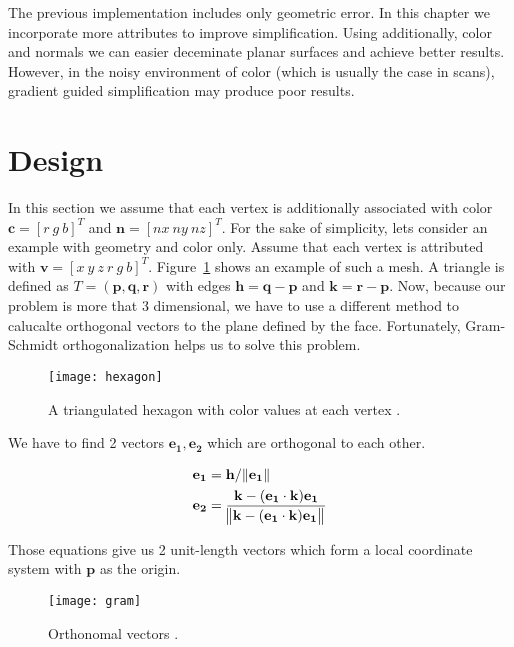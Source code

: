 The previous implementation includes only geometric error. In this chapter we incorporate more attributes to improve simplification. Using additionally, color and normals we can easier deceminate planar surfaces and achieve better results. However, in the noisy environment of color (which is usually the case in scans), gradient guided simplification may produce poor results.

\section{Design}
In this section we assume that each vertex is additionally associated with color $\mathbf{c} = [r \ g \ b]^T$ and $\mathbf{n} = [nx \ ny \ nz]^T$. For the sake of simplicity, lets consider an example with geometry and color only. Assume that each vertex is attributed with $\mathbf{v} = [x \ y \ z \ r \ g \ b]^T$. Figure~\ref{fig:hexagon} shows an example of such a mesh. A triangle is defined as $T = (\mathbf{p}, \mathbf{q}, \mathbf{r})$ with edges $\mathbf{h} = \mathbf{q} - \mathbf{p}$ and $\mathbf{k} = \mathbf{r} - \mathbf{p}$. Now, because our problem is more that 3 dimensional, we have to use a different method to calucalte orthogonal vectors to the plane defined by the face. Fortunately, Gram-Schmidt orthogonalization \cite{strang88} helps us to solve this problem.

\begin{figure}[H]
  \begin{center}
    \texttt{[image: hexagon]}
    \caption{A triangulated hexagon with color values at each vertex \cite{garland99}.}
    \label{fig:hexagon}
  \end{center}
\end{figure}

We have to find 2 vectors $\mathbf{e_1}, \mathbf{e_2}$ which are orthogonal to each other.

\begin{align}
\mathbf{e_1} &= \mathbf{h} / \norm{\mathbf{e_1}} \\
\mathbf{e_2} &= \frac{\mathbf{k} - (\mathbf{e_1} \cdot \mathbf{k})\mathbf{e_1}}{\norm{\mathbf{k} - (\mathbf{e_1} \cdot \mathbf{k})\mathbf{e_1}}}
\end{align}

Those equations give us 2 unit-length vectors which form a local coordinate system with $\mathbf{p}$ as the origin.

\begin{figure}[H]
  \begin{center}
    \texttt{[image: gram]}
    \caption{Orthonomal vectors \cite{garland99}.}
    \label{fig:gram}
  \end{center}
\end{figure}

